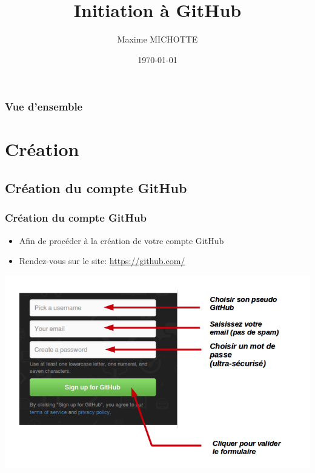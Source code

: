 \documentclass{beamer}
\title[Initiation GitHub]{Initiation \`{a} GitHub}
\author{Maxime MICHOTTE}
\institute[Universit\'{e} de Rouen]
{
Universit\'{e} de Rouen \\
\medskip
\textit{}
}
\date{\today}
\begin{document}
\begin{frame}
\titlepage
\end{frame}

\begin{frame}
\frametitle{Vue d'ensemble}
\tableofcontents
\end{frame}

\section{Cr\'eation}
\subsection{Cr\'eation du compte GitHub}
\begin{frame}
\frametitle{Cr\'eation du compte GitHub}
\begin{itemize}
\item Afin de proc\'{e}der \`{a} la cr\'{e}ation de votre compte GitHub
\item Rendez-vous sur le site: \href{https://github.com/}{https://github.com/}
\end{itemize}
\includegraphics[scale=0.3]{git_hub_home1.png}
\end{frame}
\end{document}
